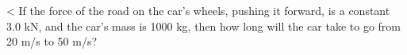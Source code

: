 <%
 If the force of the road on the car's wheels, pushing it
forward, is a constant 3.0 kN, and the car's mass is 1000
kg, then how long will the car take to go from 20 m/s to 50 m/s?

